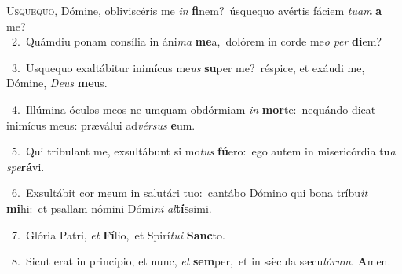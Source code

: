 \lettrine{\initial\textcolor{\initialcolor}{U}}{squequo,} Dómine, obliviscéris me \textit{in} \textbf{fi}\-nem?~\star úsquequo avértis fáciem \textit{tu}\-\textit{am} \textbf{a} me?\\
{\numbfont\textcolor{\numbcolor}{~2.}}~Quámdiu ponam consília in áni\textit{ma} \textbf{me}\-a,~\star dolórem in corde me\textit{o} \textit{per} \textbf{di}\-em?\par
{\numbfont\textcolor{\numbcolor}{~3.}}~Usquequo exaltábitur inimícus me\textit{us} \textbf{su}\-per me?~\star réspice, et exáudi me, Dómine, \textit{De}\-\textit{us} \textbf{me}\-us.\par
{\numbfont\textcolor{\numbcolor}{~4.}}~Illúmina óculos meos ne umquam obdórmiam \textit{in} \textbf{mor}\-te:~\star nequándo dicat inimícus meus: præválui ad\-\textit{vér}\-\textit{sus} \textbf{e}\-um.\par
{\numbfont\textcolor{\numbcolor}{~5.}}~Qui tríbulant me, exsultábunt si mo\textit{tus} \textbf{fú}\-ero:~\star ego autem in misericórdia tu\textit{a} \textit{spe}\-\textbf{rá}vi.\par
{\numbfont\textcolor{\numbcolor}{~6.}}~Exsultábit cor meum in salutári tuo:~\dagger cantábo Dómino qui bona tríbu\textit{it} \textbf{mi}\-hi:~\star et psallam nómini Dómi\textit{ni} \textit{al}\-\textbf{tís}simi.\par
{\numbfont\textcolor{\numbcolor}{~7.}}~Glória Patri, \textit{et} \textbf{Fí}\-lio,~\star et Spirí\-\textit{tu}\-\textit{i} \textbf{Sanc}\-to.\par
{\numbfont\textcolor{\numbcolor}{~8.}}~Sicut erat in princípio, et nunc, \textit{et} \textbf{sem}\-per,~\star et in sǽcula sæcu\-\textit{ló}\-\textit{rum}. \textbf{A}\-men.\par
